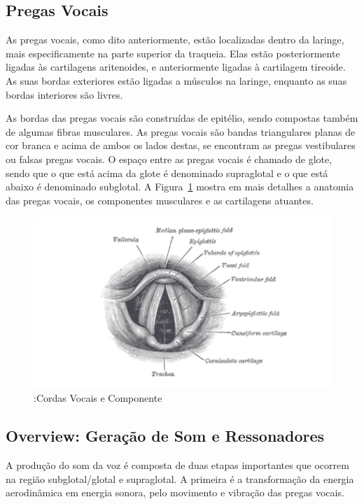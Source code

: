 	\subsection{Pregas Vocais}
	As pregas vocais, como dito anteriormente, estão localizadas dentro da laringe, mais especiﬁcamente na parte superior da traqueia. Elas estão posteriormente ligadas às cartilagens aritenoides, e anteriormente ligadas à cartilagem tireoide. As suas bordas exteriores estão ligadas a músculos na laringe, enquanto as suas bordas interiores são livres.
	
	As bordas das pregas vocais são construídas de epitélio, sendo compostas também de algumas ﬁbras musculares. As pregas vocais são bandas triangulares planas de cor branca e acima de ambos os lados destas, se encontram as pregas vestibulares ou falsas pregas vocais. O espaço entre as pregas vocais é chamado de glote, sendo que o que está acima da glote é denominado supraglotal e o que está abaixo é denominado subglotal. A Figura~\ref{fig:cordasVocais} mostra em mais detalhes a anatomia das pregas vocais, os componentes musculares e as cartilagens atuantes.
	
	\begin{figure}
		\centering
		\includegraphics[scale=0.5]{cordasVocais}
		\caption{:Cordas Vocais e Componente~\cite{Bell}}
		\label{fig:cordasVocais}
	\end{figure}	
	
	\subsection{Overview: Geração de Som e Ressonadores}
	
	A produção do som da voz é composta de duas etapas importantes que ocorrem na região subglotal/glotal e supraglotal. A primeira é a transformação da energia aerodinâmica em energia sonora, pelo movimento e vibração das pregas vocais.
	
